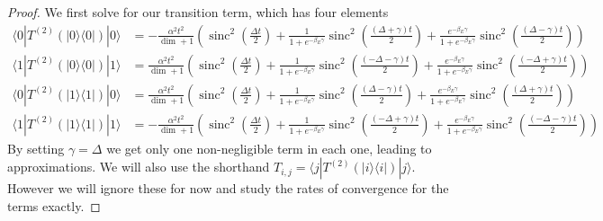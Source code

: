 \documentclass{article}
\newcommand{\ket}[1]{|#1\rangle}
\newcommand{\bra}[1]{\langle #1|}
\newcommand{\ketbra}[2]{| #1\rangle\! \langle #2|}
\DeclareMathOperator{\sinc}{sinc}
\begin{document}
\begin{proof}
We first solve for our transition term, which has four elements
\begin{align}
    \bra{0} T^{(2)}(\ketbra{0}{0}) \ket{0} &= - \frac{\alpha^2 t^2}{\dim + 1} \left( \sinc^2 \left( \frac{\Delta t}{2}\right) + \frac{1}{1 + e^{-\beta_E \gamma}} \sinc^2 \left( \frac{(\Delta + \gamma) t}{2}\right) + \frac{e^{-\beta_E \gamma}}{1 + e^{-\beta_E \gamma}} \sinc^2 \left( \frac{(\Delta - \gamma) t}{2}\right) \right) \\
    \bra{1} T^{(2)}(\ketbra{0}{0})\ket{1} &= \frac{\alpha^2 t^2}{\dim + 1} \left( \sinc^2 \left( \frac{\Delta t}{2}\right) + \frac{1}{1 + e^{-\beta_E \gamma}} \sinc^2 \left( \frac{(-\Delta - \gamma) t}{2}\right) + \frac{e^{-\beta_E \gamma}}{1 + e^{-\beta_E \gamma}} \sinc^2 \left( \frac{(-\Delta + \gamma) t}{2}\right)\right) \\
    \bra{0} T^{(2)}(\ketbra{1}{1})\ket{0} &= \frac{\alpha^2 t^2}{\dim + 1} \left( \sinc^2 \left( \frac{\Delta t}{2}\right) + \frac{1}{1 + e^{-\beta_E \gamma}} \sinc^2 \left( \frac{(\Delta - \gamma) t}{2}\right) + \frac{e^{-\beta_E \gamma}}{1 + e^{-\beta_E \gamma}} \sinc^2 \left( \frac{(\Delta + \gamma) t}{2}\right)\right) \\
    \bra{1} T^{(2)}(\ketbra{1}{1}) \ket{1} &= - \frac{\alpha^2 t^2}{\dim + 1} \left( \sinc^2 \left( \frac{\Delta t}{2}\right) + \frac{1}{1 + e^{-\beta_E \gamma}} \sinc^2 \left( \frac{(-\Delta + \gamma) t}{2}\right) + \frac{e^{-\beta_E \gamma}}{1 + e^{-\beta_E \gamma}} \sinc^2 \left( \frac{(-\Delta - \gamma) t}{2}\right) \right) 
\end{align}
By setting $\gamma = \Delta$ we get only one non-negligible term in each one, leading to approximations. We will also use the shorthand $T_{i, j} = \bra{j}T^{(2)}(\ketbra{i}{i})\ket{j}$. However we will ignore these for now and study the rates of convergence for the terms exactly. 


\end{proof}
\end{document}
